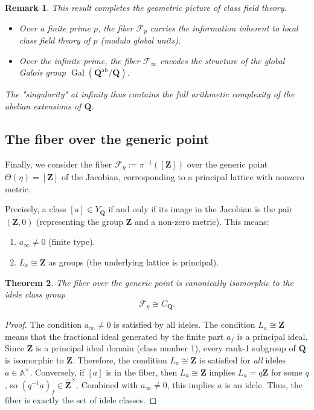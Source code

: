 \documentclass[11pt,a4paper]{article}
\newcommand{\Q}{\mathbf{Q}}
\newcommand{\Z}{\mathbf{Z}}
\newcommand{\A}{\mathbb{A}}
\newcommand{\Zhat}{\widehat{\Z}}
\theoremstyle{plain}
\newtheorem{thm}{Theorem}[section]
\newtheorem{rem}[thm]{Remark}
\theoremstyle{definition} %
\begin{document}
\begin{rem}
This result completes the geometric picture of class field theory. 
\begin{itemize}[leftmargin=*, labelindent=0pt]
    \item[-] Over a finite prime $p$, the fiber $\mathcal F_p$ carries the information inherent to local class field theory of $p$ (modulo global units).
    \item[-] Over the infinite prime, the fiber $\mathcal F_\infty$ encodes the structure of the global Galois group $\operatorname{Gal}(\Q^{\text{ab}}/\Q)$.
\end{itemize}
The "singularity" at infinity thus contains the full arithmetic complexity of the abelian extensions of $\Q$.
\end{rem}

\subsection{The fiber over the generic point}

Finally, we consider the fiber $\mathcal{F}_\eta := \pi^{-1}([\Z])$ over the generic point $\Theta(\eta)=[\Z]$ of the
Jacobian, corresponding to a principal lattice with nonzero metric.

Precisely, 
a class $[a] \in Y_\Q$ if and only if its image in the  Jacobian is the pair $(\Z, 0)$ (representing the group $\Z$ and a non-zero metric).
This means:
\begin{enumerate}
    \item $a_\infty \neq 0$ (finite type).
    \item $L_a \cong \Z$ as groups (the underlying lattice is principal).
\end{enumerate}



\begin{thm}
The fiber over the generic point is canonically isomorphic to the idele class group
\[
\mathcal{F}_\eta \cong C_\Q.
\]
\end{thm}

\begin{proof}
The condition $a_\infty \neq 0$ is satisfied by all ideles.
The condition $L_a \cong \Z$ means that the fractional ideal generated by the finite part $a_f$ is a principal ideal. Since $\Z$ is a principal ideal domain (class number 1), every rank-1 subgroup of $\Q$ is isomorphic to $\Z$.
Therefore, the condition $L_a \cong \Z$ is satisfied for \textit{all} ideles $a \in \A^\times$.
Conversely, if $[a]$ is in the fiber, then $L_a \cong \Z$ implies $L_a = q \Z$ for some $q$, so $(q^{-1}a)_f \in \Zhat^\times$. Combined with $a_\infty \neq 0$, this implies $a$ is an idele.
Thus, the fiber is exactly the set of idele classes.
\end{proof}
\end{document}
